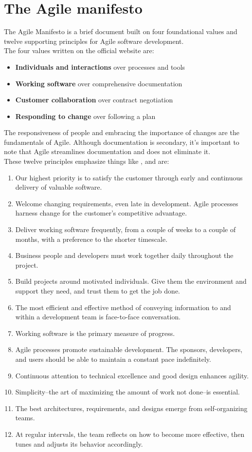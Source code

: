 %
\section{The Agile manifesto}
	The Agile Manifesto is a brief document built on four foundational values and twelve supporting principles for Agile software development\cite{agilemanifesto}.\\
	The four values written on the official website\cite{agile_official} are:
	\begin{itemize}
		\item \textbf{Individuals and interactions} over processes and tools
		\item \textbf{Working software} over comprehensive documentation
		\item \textbf{Customer collaboration} over contract negotiation
		\item \textbf{Responding to change} over following a plan
	\end{itemize}
	The responsiveness of people and embracing the importance of changes are the fundamentals of Agile.
	Although documentation is secondary, it's important to note that Agile streamlines documentation and does not eliminate it.\\
	These twelve principles emphasize things like , and are: 
	\begin{enumerate}
		\item Our highest priority is to satisfy the customer through early and continuous delivery of valuable software.
		\item Welcome changing requirements, even late in development. Agile processes harness change for the customer's competitive advantage.
		\item Deliver working software frequently, from a couple of weeks to a couple of months, with a preference to the shorter timescale.
		\item Business people and developers must work together daily throughout the project.	
		\item Build projects around motivated individuals. Give them the environment and support they need, and trust them to get the job done.
		\item The most efficient and effective method of conveying information to and within a development team is face-to-face conversation.
		\item Working software is the primary measure of progress.
		\item Agile processes promote sustainable development. The sponsors, developers, and users should be able to maintain a constant pace indefinitely.	
		\item Continuous attention to technical excellence and good design enhances agility.
		\item Simplicity--the art of maximizing the amount of work not done--is essential.
		\item The best architectures, requirements, and designs emerge from self-organizing teams.
		\item At regular intervals, the team reflects on how to become more effective, then tunes and adjusts its behavior accordingly.
	\end{enumerate}
